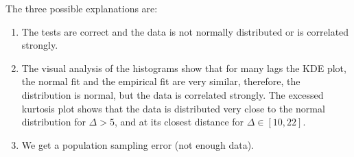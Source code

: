             \noindent The three possible explanations are:
            \begin{enumerate}
                \item The tests are correct and the data is not normally distributed or is correlated strongly.
                \item The visual analysis of the histograms show that for many lags the KDE plot, the normal fit and 
                the empirical fit are very similar, therefore, the distribution is normal, but the data is 
                correlated strongly. The excessed kurtosis plot shows that the data is distributed very close to the normal
                distribution for $\Delta > 5$, and at its closest distance for $\Delta \in [10, 22]$.
                \item We get a population sampling error (not enough data).
            \end{enumerate} 